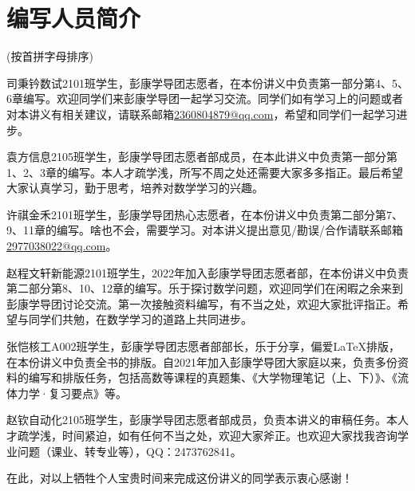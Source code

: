 \chapter*{编写人员简介}

\vspace{-3cm}

(按首拼字母排序)

\vspace{1em}

{\color{lbdeepblue}司秉钤}\quad 数试2101班学生，彭康学导团志愿者，在本份讲义中负责第一部分第4、5、6章编写。欢迎同学们来彭康学导团一起学习交流。同学们如有学习上的问题或者对本讲义有相关建议，请联系邮箱\url{2360804879@qq.com}，希望和同学们一起学习进步。

\vspace{1em}

{\color{lbdeepblue}袁方}\quad 信息2105班学生，彭康学导团志愿者部成员，在本此讲义中负责第一部分第1、2、3章的编写。本人才疏学浅，所写不周之处还需要大家多多指正。最后希望大家认真学习，勤于思考，培养对数学学习的兴趣。

\vspace{1em}

{\color{lbdeepblue}许祺}\quad 金禾2101班学生，彭康学导团热心志愿者，在本份讲义中负责第二部分第7、9、11章的编写。啥也不会，需要学习。对本讲义提出意见/勘误/合作请联系邮箱\url{2977038022@qq.com}。

\vspace{1em}

{\color{lbdeepblue}赵程文轩}\quad 新能源2101班学生，2022年加入彭康学导团志愿者部，在本份讲义中负责第二部分第8、10、12章的编写。乐于探讨数学问题，欢迎同学们在闲暇之余来到彭康学导团讨论交流。第一次接触资料编写，有不当之处，欢迎大家批评指正。希望与同学们共勉，在数学学习的道路上共同进步。

\vspace{1em}

{\color{lbdeepblue}张恺}\quad 核工A002班学生，彭康学导团志愿者部部长，乐于分享，偏爱\LaTeX 排版，在本份讲义中负责全书的排版。自2021年加入彭康学导团大家庭以来，负责多份资料的编写和排版任务，包括高数等课程的真题集、《大学物理笔记（上、下）》、《流体力学·复习要点》等。

\vspace{1em}

{\color{lbdeepblue}赵钦}\quad 自动化2105班学生，彭康学导团志愿者部成员，负责本讲义的审稿任务。本人才疏学浅，时间紧迫，如有任何不当之处，欢迎大家斧正。也欢迎大家找我咨询学业问题（课业、转专业等），QQ：2473762841。

\vspace{2em}

在此，对以上牺牲个人宝贵时间来完成这份讲义的同学表示衷心感谢！